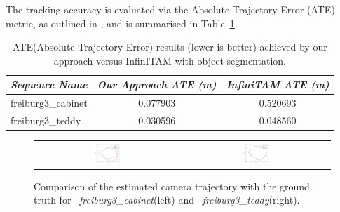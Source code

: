 
The tracking accuracy is evaluated via the Absolute Trajectory Error (ATE) metric, as outlined in \cite{sturm12iros}, and is summarised in Table~\ref{ateTable}.

\begin{table}[!t]
	{
        \footnotesize
		\begin{center}
			\begin{tabular}{l@{\hskip 1cm} c c}
				\emph{Sequence Name} & \emph{Our Approach ATE (m)} & \emph{InfiniTAM ATE (m)}\\
				\midrule
				\textsf{freiburg3\_cabinet} & 0.077903 & 0.520693\\
				\textsf{freiburg3\_teddy}   & 0.030596 & 0.048560 
			\end{tabular}
		\end{center}
	}
   \vspace{-4mm}
	\caption{ATE(Absolute Trajectory Error) results (lower is better) achieved by our approach versus InfinITAM with object segmentation.}
	\label{ateTable}
\end{table}

\begin{figure}[!t]
	\centering
	\begin{tabular}{cc}
		\includegraphics[width=0.2\textwidth]{results/comparative_cabinet.png} &
		\includegraphics[width=0.2\textwidth]{results/comparative_teddy_clean.png}
	\end{tabular}
    \vspace{-3mm}
	\caption{
        Comparison of the estimated camera trajectory with the ground truth for
		~\textit{freiburg3\_cabinet}(left)  and ~\textit{freiburg3\_teddy}(right).
	}
\label{fig:tumTrajectories}
\end{figure}


